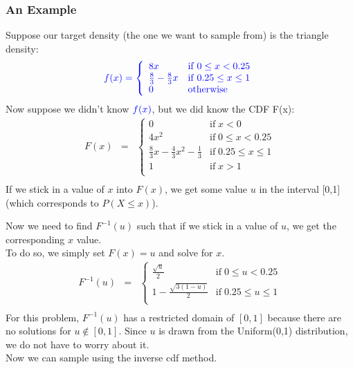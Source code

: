 \documentclass{beamer}
\begin{document}
\begin{frame}
\frametitle{An Example}
\pause
Suppose our target density (the one we want to sample from) is the triangle density:
\pause
\begin{eqnarray*}
\textcolor{blue}{f(x) = \left\lbrace \begin{array}{ll} 8x & \mathrm{if} \;
0 \le x < 0.25 \\
\frac{8}{3} - \frac{8}{3} x & \mathrm{if} \; 0.25 \le x \le 1 \\
0 & \mathrm{otherwise} \end{array} \right.}
\end{eqnarray*}
\pause
Now suppose we didn't know $\textcolor{blue}{f(x)}$, but we did know the CDF F(x):
\pause
\begin{eqnarray*}
F(x) &=& \left\lbrace \begin{array}{ll} 0 & \mathrm{if} \; x < 0 \\
4x^2 & \mathrm{if} \; 0 \le x < 0.25 \\
\frac{8}{3}x - \frac{4}{3}x^2 - \frac{1}{3} & \mathrm{if} \; 0.25 \le x \le 1 \\
1 & \mathrm{if} \; x > 1 \\
\end{array} \right.\\
\end{eqnarray*}
\pause
If we stick in a value of $x$ into $F(x)$, we get some value $u$ in
the interval [0,1] (which corresponds to $P(X \le x)$).
\end{frame}

\begin{frame}
Now we need to find $F^{-1}(u)$ such that if we stick in a value of
$u$, we get the corresponding $x$ value.\\
\pause
\bigskip
To do so, we simply set $F(x) = u$ and solve for $x$.
\pause
\begin{eqnarray*}
F^{-1}(u) &=& \left\lbrace \begin{array}{ll} \frac{\sqrt{u}}{2} & \mathrm{if} \; 0 \le u < 0.25 \\
1 - \frac{\sqrt{3(1-u)}}{2} & \mathrm{if} \; 0.25 \le u \le 1 \\
\end{array} \right.\\
\end{eqnarray*}
\pause
For this problem, $F^{-1}(u)$ has a restricted domain of $[0,1]$
because there are no solutions for $u \notin [0,1]$.  Since $u$
is drawn from the Uniform(0,1) distribution, we do not have to worry
about it.\\
\pause
\bigskip
Now we can sample using the inverse cdf method.
\end{frame}
\end{document}
